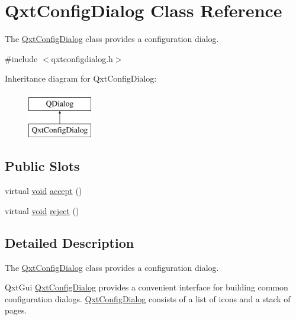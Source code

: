 \hypertarget{class_qxt_config_dialog}{\section{Qxt\-Config\-Dialog Class Reference}
\label{class_qxt_config_dialog}
}


The \hyperlink{class_qxt_config_dialog}{Qxt\-Config\-Dialog} class provides a configuration dialog.  




{\ttfamily \#include $<$qxtconfigdialog.\-h$>$}

Inheritance diagram for Qxt\-Config\-Dialog\-:\begin{figure}[H]
\begin{center}
\leavevmode
\includegraphics[height=2.000000cm]{class_qxt_config_dialog}
\end{center}
\end{figure}
\subsection*{Public Slots}
\begin{DoxyCompactItemize}
\item 
virtual \hyperlink{group___u_a_v_objects_plugin_ga444cf2ff3f0ecbe028adce838d373f5c}{void} \hyperlink{class_qxt_config_dialog_a8be444973ce9341e10610beb1cf7327d}{accept} ()
\item 
virtual \hyperlink{group___u_a_v_objects_plugin_ga444cf2ff3f0ecbe028adce838d373f5c}{void} \hyperlink{class_qxt_config_dialog_a48076a45465b0249fe7e31301e6953e2}{reject} ()
\end{DoxyCompactItemize}


\subsection{Detailed Description}
The \hyperlink{class_qxt_config_dialog}{Qxt\-Config\-Dialog} class provides a configuration dialog. 

Qxt\-Gui \hyperlink{class_qxt_config_dialog}{Qxt\-Config\-Dialog} provides a convenient interface for building common configuration dialogs. \hyperlink{class_qxt_config_dialog}{Qxt\-Config\-Dialog} consists of a list of icons and a stack of pages.

